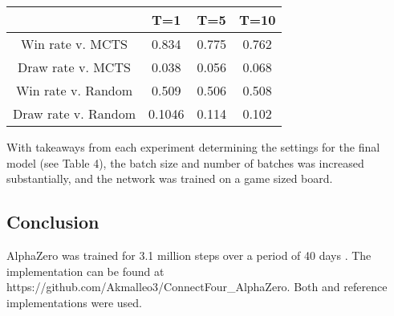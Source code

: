 \documentclass[twoside,11pt]{article}
\begin{document}
\begin{table}[ht]
    \caption{}
\begin{center}
    \begin{tabular}{||c c c c||} 
    \hline
     & T=1 & T=5 & T=10 \\ [0.5ex] 
    \hline\hline
    Win rate v. MCTS & 0.834  & 0.775 & 0.762 \\ 
    \hline
    Draw rate v. MCTS &  0.038  & 0.056 & 0.068 \\
    \hline
    Win rate v. Random &  0.509 & 0.506 & 0.508\\
    \hline
    Draw rate v. Random & 0.1046 & 0.114 & 0.102 \\
    \hline
   \end{tabular}
   \end{center}
\end{table}

With takeaways from each experiment determining the settings for the final model (see Table 4),
the batch size and number of batches was increased substantially, and the network
was trained on a game sized board. 






\subsection{Conclusion}
AlphaZero was trained for 3.1 million steps over a period of 40 days \cite{AlphaZero}. 
The implementation can be found at https://github.com/Akmalleo3/ConnectFour\_AlphaZero.
Both  \cite{Supplementary} and \cite{refImplementation} 
reference implementations were 
used.






\vskip 0.2in



\appendix
\end{document}
